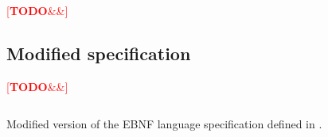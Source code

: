 \documentclass[english,engineering]{wizthesis}
\newcommand{\todo}[1]{%
  \textcolor{red}{[\textbf{TODO}\ifx&#1&{}\else{ }\fi\emph{#1}]}%
}
\begin{document}
\todo{}



\listoffigures

\listoftables

\listoflistings

\begin{appendices}

\chapter{Modified specification} \label{ch:modified-spec}

\todo{}

\begin{listing}[H]
  \inputminted[fontsize=\small,frame=lines,breaklines,linenos]
    {lexers/ebnf_lexer.py:EbnfLexer -x}{listings/specification.ebnf}
  \caption{Modified version of the EBNF language specification defined in
  \cite{iso-14977}.}
  \label{lst:specification}
\end{listing}

\end{appendices}
\end{document}
